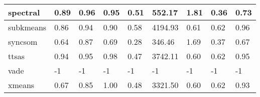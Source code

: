 \begin{table}[H]
\begin{tabular}{|l|l|l|l|l|l|l|l|l|}
\hline
spectral & 0.89 & 0.96 & 0.95 & 0.51 & 552.17 & 1.81 & 0.36 & 0.73 \\
\hline
subkmeans & 0.86 & 0.94 & 0.90 & 0.58 & 4194.93 & 0.61 & 0.62 & 0.96 \\
\hline
syncsom & 0.64 & 0.87 & 0.69 & 0.28 & 346.46 & 1.69 & 0.37 & 0.67 \\
\hline
ttsas & 0.94 & 0.95 & 0.98 & 0.47 & 3742.11 & 0.60 & 0.62 & 0.95 \\
\hline
vade & -1 & -1 & -1 & -1 & -1 & -1 & -1 & -1 \\
\hline
xmeans & 0.67 & 0.85 & 1.00 & 0.48 & 3321.50 & 0.60 & 0.62 & 0.93 \\
\hline
\end{tabular}
\end{table}




